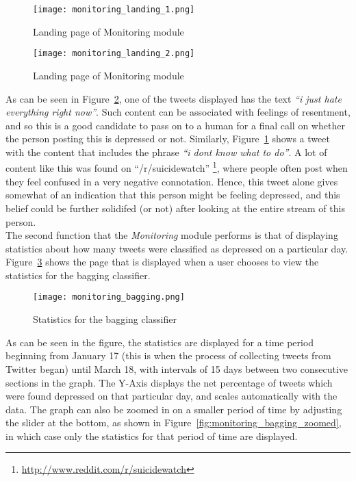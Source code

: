 \begin{figure}
    \centering
    \texttt{[image: monitoring\_landing\_1.png]}
    \caption{Landing page of Monitoring module}
    \label{fig:monitoring_landing_1}
\end{figure}

\begin{figure}
    \centering
    \texttt{[image: monitoring\_landing\_2.png]}
    \caption{Landing page of Monitoring module}
    \label{fig:monitoring_landing_2}
\end{figure}

As can be seen in Figure~\ref{fig:monitoring_landing_2}, one of the tweets displayed has the text \emph{``i just hate everything right now''}. Such content can be associated with feelings of resentment, and so this is a good candidate to pass on to a human for a final call on whether the person posting this is depressed or not. Similarly, Figure~\ref{fig:monitoring_landing_1} shows a tweet with the content that includes the phrase \emph{``i dont know what to do''}. A lot of content like this was found on ``/r/suicidewatch'' \footnote{\url{http://www.reddit.com/r/suicidewatch}}, where people often post when they feel confused in a very negative connotation. Hence, this tweet alone gives somewhat of an indication that this person might be feeling depressed, and this belief could be further solidifed (or not) after looking at the entire stream of this person.\\

The second function that the \emph{Monitoring} module performs is that of displaying statistics about how many tweets were classified as depressed on a particular day. Figure~\ref{fig:monitoring_bagging} shows the page that is displayed when a user chooses to view the statistics for the bagging classifier.\\

\begin{figure}
    \centering
    \texttt{[image: monitoring\_bagging.png]}
    \caption{Statistics for the bagging classifier}
    \label{fig:monitoring_bagging}
\end{figure}

As can be seen in the figure, the statistics are displayed for a time period beginning from January 17 (this is when the process of collecting tweets from Twitter began) until March 18, with intervals of 15 days between two consecutive sections in the graph. The Y-Axis displays the net percentage of tweets which were found depressed on that particular day, and scales automatically with the data.  The graph can also be zoomed in on a smaller period of time by adjusting the slider at the bottom, as shown in Figure~\ref{fig:monitoring_bagging_zoomed}, in which case only the statistics for that period of time are displayed.\\

